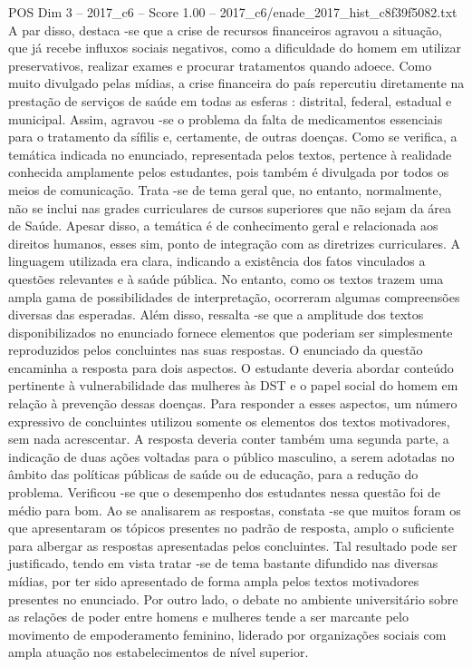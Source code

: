 \begin{textsample}{POS Dim 3 – 2017\_c6 – Score 1.00 – 2017\_c6/enade\_2017\_hist\_c8f39f5082.txt}
A par disso, destaca -se que a crise de recursos financeiros agravou a situação, que já recebe influxos sociais negativos, como a dificuldade do homem em utilizar preservativos, realizar exames e procurar tratamentos quando adoece.
Como muito divulgado pelas mídias, a crise financeira do país repercutiu diretamente na prestação de serviços de saúde em todas as esferas : distrital, federal, estadual e municipal.
Assim, agravou -se o problema da falta de medicamentos essenciais para o tratamento da sífilis e, certamente, de outras doenças.
Como se verifica, a temática indicada no enunciado, representada pelos textos, pertence à realidade conhecida amplamente pelos estudantes, pois também é divulgada por todos os meios de comunicação.
Trata -se de tema geral que, no entanto, normalmente, não se inclui nas grades curriculares de cursos superiores que não sejam da área de Saúde.
Apesar disso, a temática é de conhecimento geral e relacionada aos direitos humanos, esses sim, ponto de integração com as diretrizes curriculares.
A linguagem utilizada era clara, indicando a existência dos fatos vinculados a questões relevantes e à saúde pública.
No entanto, como os textos trazem uma ampla gama de possibilidades de interpretação, ocorreram algumas compreensões diversas das esperadas.
Além disso, ressalta -se que a amplitude dos textos disponibilizados no enunciado fornece elementos que poderiam ser simplesmente reproduzidos pelos concluintes nas suas respostas.
O enunciado da questão encaminha a resposta para dois aspectos.
O estudante deveria abordar conteúdo pertinente à vulnerabilidade das mulheres às DST e o papel social do homem em relação à prevenção dessas doenças.
Para responder a esses aspectos, um número expressivo de concluintes utilizou somente os elementos dos textos motivadores, sem nada acrescentar.
A resposta deveria conter também uma segunda parte, a indicação de duas ações voltadas para o público masculino, a serem adotadas no âmbito das políticas públicas de saúde ou de educação, para a redução do problema.
Verificou -se que o desempenho dos estudantes nessa questão foi de médio para bom.
Ao se analisarem as respostas, constata -se que muitos foram os que apresentaram os tópicos presentes no padrão de resposta, amplo o suficiente para albergar as respostas apresentadas pelos concluintes.
Tal resultado pode ser justificado, tendo em vista tratar -se de tema bastante difundido nas diversas mídias, por ter sido apresentado de forma ampla pelos textos motivadores presentes no enunciado.
Por outro lado, o debate no ambiente universitário sobre as relações de poder entre homens e mulheres tende a ser marcante pelo movimento de empoderamento feminino, liderado por organizações sociais com ampla atuação nos estabelecimentos de nível superior.

\end{textsample}
